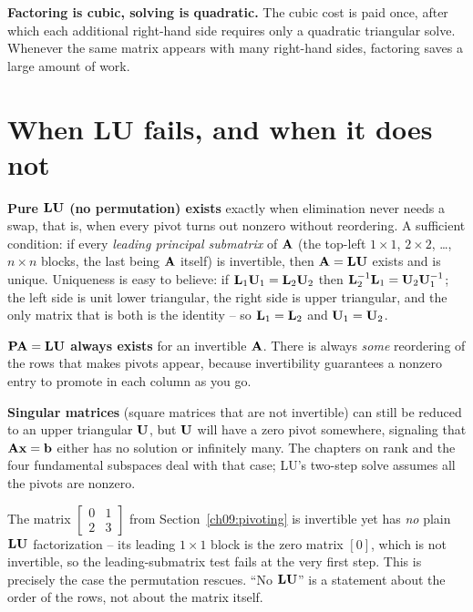\begin{focusbox}
\textbf{Factoring is cubic, solving is quadratic.} The cubic cost is paid once, after
which each additional right-hand side requires only a quadratic triangular solve. Whenever
the same matrix appears with many right-hand sides, factoring saves a large amount of work.
\end{focusbox}

\section{When LU fails, and when it does not}
\label{ch09:existence}

\textbf{Pure $\mathbf{L}\mathbf{U}$ (no permutation) exists} exactly when elimination never needs a
swap, that is, when every pivot turns out nonzero without reordering. A sufficient
condition: if every \emph{leading principal submatrix} of $\mathbf{A}$ (the top-left
$1\times 1$, $2\times 2$, \dots, $n\times n$ blocks, the last being $\mathbf{A}$ itself) is invertible, then $\mathbf{A}=\mathbf{L}\mathbf{U}$
exists and is unique. Uniqueness is easy to believe: if $\mathbf{L}_1\mathbf{U}_1=\mathbf{L}_2\mathbf{U}_2$
then $\mathbf{L}_2^{-1}\mathbf{L}_1=\mathbf{U}_2\mathbf{U}_1^{-1}$; the left side is unit lower triangular,
the right side is upper triangular, and the only matrix that is both is the identity -- so
$\mathbf{L}_1=\mathbf{L}_2$ and $\mathbf{U}_1=\mathbf{U}_2$.

\textbf{$\mathbf{P}\mathbf{A}=\mathbf{L}\mathbf{U}$ always exists} for an invertible $\mathbf{A}$. There is
always \emph{some} reordering of the rows that makes pivots appear, because invertibility
guarantees a nonzero entry to promote in each column as you go.

\textbf{Singular matrices} (square matrices that are not invertible) can still be reduced to an upper triangular $\mathbf{U}$, but $\mathbf{U}$
will have a zero pivot somewhere, signaling that $\mathbf{A}\mathbf{x}=\mathbf{b}$ either has no
solution or infinitely many. The chapters on rank and the four fundamental subspaces deal
with that case; LU's two-step solve assumes all the pivots are nonzero.

\begin{remark}
The matrix $\begin{bmatrix}0&1\\2&3\end{bmatrix}$ from
Section~\ref{ch09:pivoting} is invertible yet has \emph{no} plain $\mathbf{L}\mathbf{U}$
factorization -- its leading $1\times 1$ block is the zero matrix $[0]$, which is not
invertible, so the leading-submatrix test fails at the very first step. This is precisely
the case the permutation rescues. ``No $\mathbf{L}\mathbf{U}$'' is a statement about the order of
the rows, not about the matrix itself.
\end{remark}

